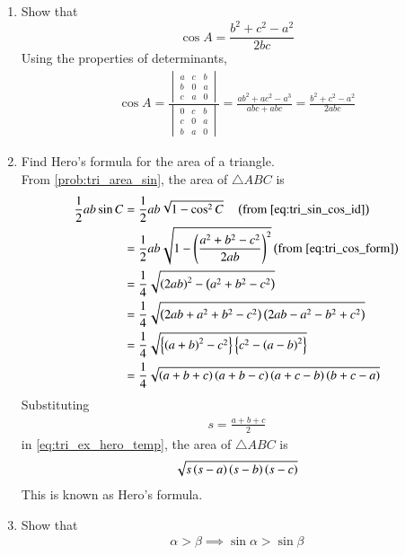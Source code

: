 \begin{enumerate}[label=\thesubsection.\arabic*.,ref=\thesubsection.\theenumi]
\item Show that 
\begin{equation}
\label{eq:tri_cos_form}
\cos A = \frac{b^2+c^2-a^2}{2bc}
\end{equation}
%
\solution 
Using the properties of determinants,
%
\begin{align}
\cos A = \frac{
\begin{vmatrix}
a & c & b \\
b & 0 & a \\
c & a & 0
\end{vmatrix}
	}
	{
\begin{vmatrix}
0 & c & b \\
c & 0 & a \\
b & a & 0
\end{vmatrix}
	}
	=\frac{ab^2 + ac^2 - a^3}{abc + abc} 
= \frac{b^2 + c^2 - a^2}{2abc}
\end{align}
%
\item Find Hero's formula for the area of a triangle.
\\
\solution 
From \eqref{prob:tri_area_sin}, the area of $\triangle ABC$ is 
\begin{align}
\label{eq:tri_geo_area_sin_form}
 \frac{1}{2}ab\sin C
&=\frac{1}{2}ab\sqrt{1-\cos^2C} 
\quad \left(\text{from } \eqref{eq:tri_sin_cos_id}
\right)
\\
&=\frac{1}{2}ab\sqrt{1-\left(\frac{a^2+b^2-c^2}{2ab}\right)^2} \left(\text{from } \eqref{eq:tri_cos_form}
\right)
\\
&=\frac{1}{4}\sqrt{\left(2ab\right)^2-\left(a^2+b^2-c^2\right)}
\\
&=\frac{1}{4}\sqrt{\left(2ab+a^2+b^2-c^2\right)\left(2ab-a^2-b^2+c^2\right)}
\\
&= \frac{1}{4}\sqrt{\left\{\left(a+b\right)^2-c^2\right\}\left\{c^2-\left(a-b\right)^2\right\}}
\\
&= \frac{1}{4}\sqrt{\left(a+b+c\right)\left(a+b-c\right)\left(a+c-b\right)\left(b+c-a\right)}
\label{eq:tri_ex_hero_temp}
\end{align}
Substituting 
%
\begin{align}
s=\frac{a+b+c}{2}
\end{align}
%
in \eqref{eq:tri_ex_hero_temp}, the area of $\triangle ABC$ is 
%
\begin{align}
\label{eq:tri_area_hero}
\sqrt{s\left(s-a\right)\left(s-b\right)\left(s-c\right)}
\end{align}
%
This is known as Hero's formula.
\item Show that 
%
\begin{align}
\label{eq:trig_id_sin_inc}
\alpha > \beta \implies \sin \alpha > \sin \beta
\end{align}
%


\end{enumerate}
